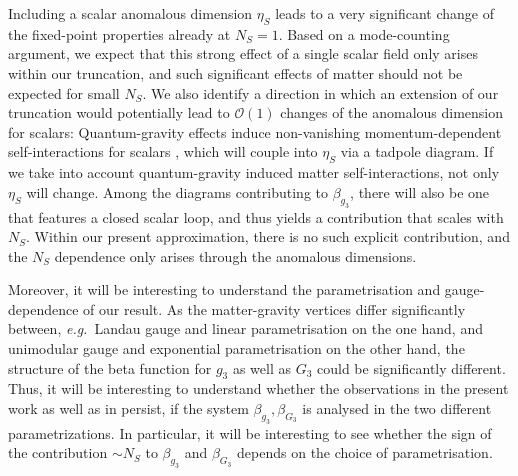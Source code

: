 \documentclass[11pt]{book}
\newcommand\eg{\textit{e.g.}\ }
\numberwithin{equation}{chapter}
\begin{document}
Including a scalar anomalous dimension $\eta_S$ leads to a very significant change
of the fixed-point properties already at $N_S=1$.
Based on a mode-counting argument, we
expect that this strong effect of a single scalar field only arises within our truncation,
and such significant effects of matter should not be expected for small $N_S$.
We also identify a direction in which an extension of our truncation would potentially
lead to $\mathcal{O}(1)$ changes of the anomalous dimension for scalars:
Quantum-gravity effects induce non-vanishing momentum-dependent self-interactions
for scalars \cite{Eichhorn:2012va}, which will couple into $\eta_S$ via a tadpole diagram.
If we take into account quantum-gravity induced matter self-interactions, not only $\eta_S$ will change.
Among the diagrams contributing to $\beta_{g_3}$,
there will also be one that features a closed scalar loop,
and thus yields a contribution that scales with $N_S$. Within our present approximation,
there is no such explicit contribution, and the $N_S$ dependence only arises through the anomalous dimensions.

Moreover, it will be interesting to understand the parametrisation and gauge-dependence of our result.
As the matter-gravity vertices differ significantly between,
\eg Landau gauge and linear parametrisation on the one hand,
and unimodular gauge and exponential parametrisation on the other hand,
the structure of the beta function for $g_3$ as well as $G_3$ could be significantly different.
Thus, it will be interesting to understand whether the observations in the present work as
well as in \cite{Meibohm:2015twa} persist,
if the system $\beta_{g_3}, \beta_{G_3}$ is analysed in the two different parametrizations.
In particular, it will be interesting to see whether the sign of the contribution
$\sim N_S$ to $\beta_{g_3}$ and $\beta_{G_3}$ depends on the choice of parametrisation.




\nocite{*}





\end{document}

